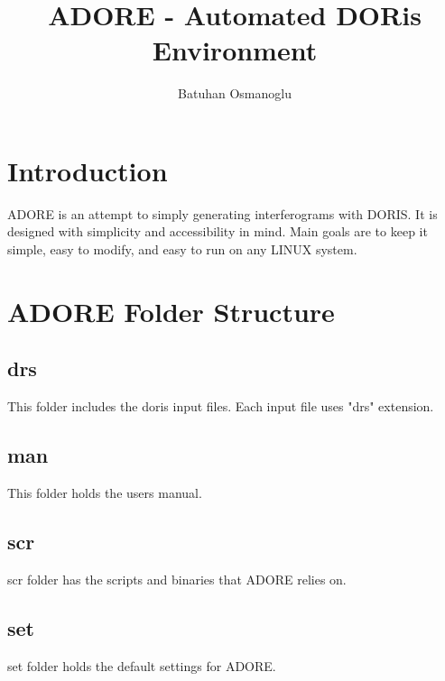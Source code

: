\documentclass[letterpaper,10pt]{article}
\title{ADORE - Automated DORis Environment}
\author{Batuhan Osmanoglu}
\begin{document}
\maketitle

\begin{abstract}

\end{abstract}

\section{Introduction}
ADORE is an attempt to simply generating interferograms with DORIS. It is designed with simplicity and accessibility in mind. Main goals are to keep it simple, easy to modify, and easy to run on any LINUX system. 

\section{ADORE Folder Structure}
\subsection{drs}
This folder includes the doris input files. Each input file uses "drs" extension. 
\subsection{man}
This folder holds the users manual.
\subsection{scr}
scr folder has the scripts and binaries that ADORE relies on. 
\subsection{set}
set folder holds the default settings for ADORE. 



%
%
\end{document}
